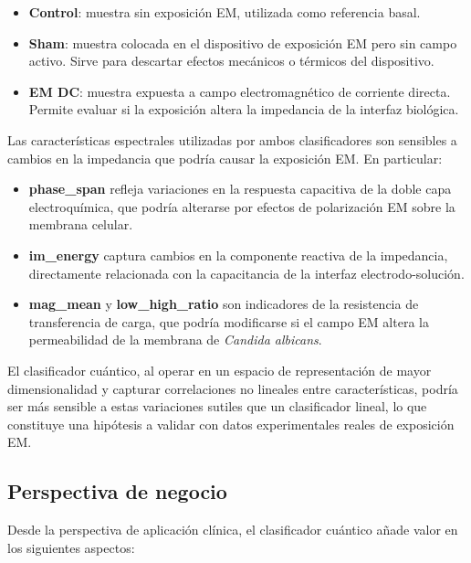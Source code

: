 \documentclass[11pt,a4paper,spanish]{book}
\begin{document}
\begin{itemize}
	\item \textbf{Control}: muestra sin exposici\'{o}n EM, utilizada como referencia basal.
	\item \textbf{Sham}: muestra colocada en el dispositivo de exposici\'{o}n EM pero sin campo activo. Sirve para descartar efectos mec\'{a}nicos o t\'{e}rmicos del dispositivo.
	\item \textbf{EM DC}: muestra expuesta a campo electromagn\'{e}tico de corriente directa. Permite evaluar si la exposici\'{o}n altera la impedancia de la interfaz biol\'{o}gica.
\end{itemize}

Las caracter\'{i}sticas espectrales utilizadas por ambos clasificadores son sensibles a cambios en la impedancia que podr\'{i}a causar la exposici\'{o}n EM. En particular:

\begin{itemize}
	\item \textbf{phase\_span} refleja variaciones en la respuesta capacitiva de la doble capa electroqu\'{i}mica, que podr\'{i}a alterarse por efectos de polarizaci\'{o}n EM sobre la membrana celular.
	\item \textbf{im\_energy} captura cambios en la componente reactiva de la impedancia, directamente relacionada con la capacitancia de la interfaz electrodo-soluci\'{o}n.
	\item \textbf{mag\_mean} y \textbf{low\_high\_ratio} son indicadores de la resistencia de transferencia de carga, que podr\'{i}a modificarse si el campo EM altera la permeabilidad de la membrana de \textit{Candida albicans}.
\end{itemize}

El clasificador cu\'{a}ntico, al operar en un espacio de representaci\'{o}n de mayor dimensionalidad y capturar correlaciones no lineales entre caracter\'{i}sticas, podr\'{i}a ser m\'{a}s sensible a estas variaciones sutiles que un clasificador lineal, lo que constituye una hip\'{o}tesis a validar con datos experimentales reales de exposici\'{o}n EM.

\subsection{Perspectiva de negocio}

Desde la perspectiva de aplicaci\'{o}n cl\'{i}nica, el clasificador cu\'{a}ntico a\~{n}ade valor en los siguientes aspectos:
\end{document}
